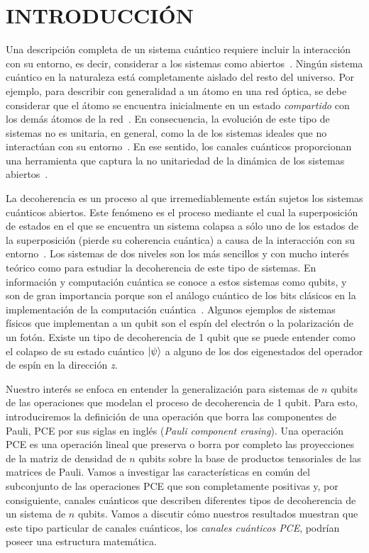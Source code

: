 \chapter{INTRODUCCIÓN}

Una descripción completa de un sistema cuántico requiere incluir la interacción
con su entorno, es decir, considerar a los sistemas como 
abiertos~\cite{breuer2002theory}. Ningún sistema cuántico en la
naturaleza está completamente aislado del resto del universo.  
Por ejemplo, para describir con generalidad a un átomo en una red óptica, se debe
considerar que el átomo se encuentra inicialmente en un estado \textit{compartido} 
con los demás átomos de la red~\cite{pepino2011open}. En consecuencia,
la evolución de este tipo de sistemas no es unitaria, en general, como 
la de los sistemas ideales que no interactúan con su entorno~\cite{preskill1998lecture}. 
En ese sentido, los canales cuánticos proporcionan una herramienta que captura 
la no unitariedad de la dinámica de los sistemas abiertos~\cite{nielsen_chuang_2011}.


La decoherencia es un proceso al que irremediablemente están sujetos los 
sistemas cuánticos abiertos. 
Este fenómeno es el proceso mediante 
el cual la superposición de estados en el que se encuentra un sistema colapsa a 
sólo uno de los estados de la superposición (pierde su coherencia cuántica)
a causa de la interacción con su entorno~\cite{breuer2002theory}. 
Los sistemas de dos niveles son 
los más sencillos y con mucho interés teórico como para estudiar 
la decoherencia de este tipo de sistemas. En información y computación 
cuántica se conoce a estos sistemas como qubits, y son de gran importancia 
porque son el análogo cuántico de los bits clásicos en 
la implementación de la computación cuántica~\cite{nielsen_chuang_2011}. 
Algunos ejemplos de sistemas físicos que implementan a un qubit son el espín
del electrón o la polarización de un fotón. 
Existe un tipo de decoherencia de 1 qubit que se puede entender como 
el colapso de su estado cuántico $\ket{\psi}$ a alguno de los dos eigenestados
del operador de espín en la dirección \textit{z}.


Nuestro interés se enfoca en entender la generalización
para sistemas de $n$ qubits de las operaciones que modelan el proceso de 
decoherencia de 1 qubit. Para esto, introduciremos la definición de una 
operación que borra las componentes de Pauli, PCE por sus siglas en inglés
(\textit{Pauli component erasing}). Una operación PCE es una operación lineal 
que preserva o borra por completo las proyecciones de la matriz de densidad de $n$ qubits
sobre la base de productos tensoriales de las matrices de Pauli. Vamos a investigar 
las características en común del subconjunto de las operaciones PCE que son 
completamente positivas y, por consiguiente, canales cuánticos que describen
diferentes tipos de decoherencia de un sistema de $n$ qubits. Vamos a 
discutir cómo nuestros resultados muestran que este tipo particular de 
canales cuánticos, los \textit{canales cuánticos PCE}, podrían poseer 
una estructura matemática. 